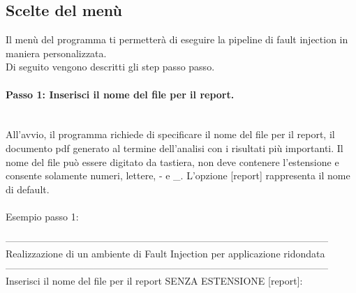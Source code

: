 \documentclass{article}
\begin{document}
\subsection{Scelte del menù}
Il menù del programma ti permetterà di eseguire la pipeline di fault injection in maniera personalizzata.\\
Di seguito vengono descritti gli step passo passo.

\paragraph{Passo 1: Inserisci il nome del file per il report.}\leavevmode\\
All'avvio, il programma richiede di specificare il nome del file per il report, il documento pdf generato al termine dell'analisi con i risultati più importanti.
Il nome del file può essere digitato da tastiera, non deve contenere l'estensione e consente solamente numeri, lettere, - e \_.
L'opzione [report] rappresenta il nome di default.\\ \\
Esempio passo 1:
\begin{tcolorbox}[colback=black,coltext=white,sharp corners,boxrule=0.5mm,width=\textwidth]
---------------------------------------------------------------------------------------------------\\
 Realizzazione di un ambiente di Fault Injection per applicazione ridondata \\
 ---------------------------------------------------------------------------------------------------\\

Inserisci il nome del file per il report SENZA ESTENSIONE [report]:
\end{tcolorbox}
\end{document}
